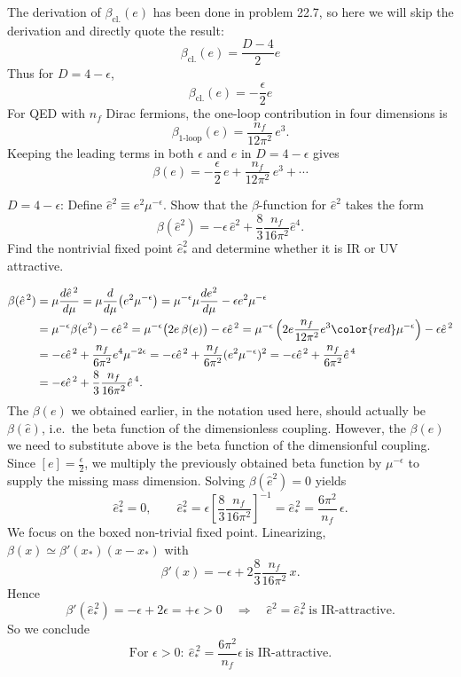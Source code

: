 \begin{solution}[30.5]
	The derivation of $\beta_{\text{cl.}}(e)$ has been done in problem 22.7, so here we will skip the derivation and directly quote the result:
	\[
\beta_{\text{cl.}}(e)=\frac{D-4}{2}e
	\]
	Thus for $D=4-\epsilon$,
	\[
	  \beta_{\text{cl.}}(e)=-\frac{\epsilon}{2}e
	\]
	For QED with $n_f$ Dirac fermions, the one-loop contribution in four dimensions is
	\[
	\beta_{\text{1-loop}}(e)=\frac{n_f}{12\pi^2}\,e^3 .
	\]
	Keeping the leading terms in both $\epsilon$ and $e$ in $D=4-\epsilon$ gives
	\[
	\boxed{\beta(e)= -\frac{\epsilon}{2}\,e+\frac{n_f}{12\pi^2}\,e^3+\cdots}
	\]
\end{solution}
\begin{problem}
    \(D=4-\epsilon\): Define \(\hat e^2\equiv e^2\mu^{-\epsilon}\). Show that the \(\beta\)-function for \(\hat e^2\) takes the form
    \[
        \beta(\hat e^2)=-\epsilon\,\hat e^2+\frac{8}{3}\frac{n_f}{16\pi^2}\hat e^4.
    \]
    Find the nontrivial fixed point \(\hat e_*^2\) and determine whether it is IR or UV attractive.
\end{problem}
\begin{solution}[30.6]
\[
\begin{aligned}
	\beta(\hat e^{\,2})
	&=\mu\frac{d\hat e^{\,2}}{d\mu}
	=\mu\frac{d}{d\mu}\!\left(e^2\mu^{-\epsilon}\right)
	=\mu^{-\epsilon}\mu\frac{de^2}{d\mu}-\epsilon e^2\mu^{-\epsilon} \\
	&=\mu^{-\epsilon}\beta(e^2)-\epsilon\hat e^{\,2}
	=\mu^{-\epsilon}\bigl(2e\,\beta(e)\bigr)-\epsilon\hat e^{\,2}
	=\mu^{-\epsilon}\left(2e\frac{n_f}{12\pi^2}e^3{\color{red}\mu^{-\epsilon}}\right)-\epsilon\hat e^{\,2} \\
	&=-\epsilon\hat e^{\,2}+\frac{n_f}{6\pi^2}e^4\mu^{-2\epsilon}
	=-\epsilon\hat e^{\,2}+\frac{n_f}{6\pi^2}(e^2\mu^{-\epsilon})^2
	=-\epsilon\hat e^{\,2}+\frac{n_f}{6\pi^2}\hat e^{\,4} \\
	&=-\epsilon\hat e^{\,2}+\frac{8}{3}\frac{n_f}{16\pi^2}\hat e^{\,4}.
\end{aligned}
\]
	The \(\beta(e)\) we obtained earlier, in the notation used here, should actually be \(\beta(\hat e)\), i.e.\ the beta function of the dimensionless coupling. However, the \(\beta(e)\) we need to substitute above is the beta function of the dimensionful coupling. Since \([e]=\frac{\epsilon}{2}\), we multiply the previously obtained beta function by \(\mu^{-\epsilon}\) to supply the missing mass dimension. Solving $\beta(\hat{e}^2)=0$ yields
	\[
	\hat{e}^2_*=0,
	\qquad
	\hat{e}^2_*=\epsilon\left[\frac{8}{3}\frac{n_f}{16\pi^2}\right]^{-1}
	=\boxed{\hat e_*^{\,2}=\frac{6\pi^2}{n_f}\,\epsilon.}
	\]
	We focus on the boxed non-trivial fixed point. Linearizing, $\beta(x)\simeq \beta'(x_*)(x-x_*)$ with
	\[
	\beta'(x)= -\epsilon+2\frac{8}{3}\frac{n_f}{16\pi^2}\,x.
	\]
	Hence
	\[
	\beta'(\hat e_*^{\,2})=-\epsilon+2\epsilon=+\epsilon>0 \quad\Rightarrow\quad \hat e^2=\hat e_*^{\,2}\ \text{is IR-attractive}.
	\]
	So we conclude
	\[
	\boxed{\text{For } \epsilon>0:\ \hat e_*^{\,2}=\frac{6\pi^2}{n_f}\epsilon\ \text{is IR-attractive.}}
	\]
\end{solution}
